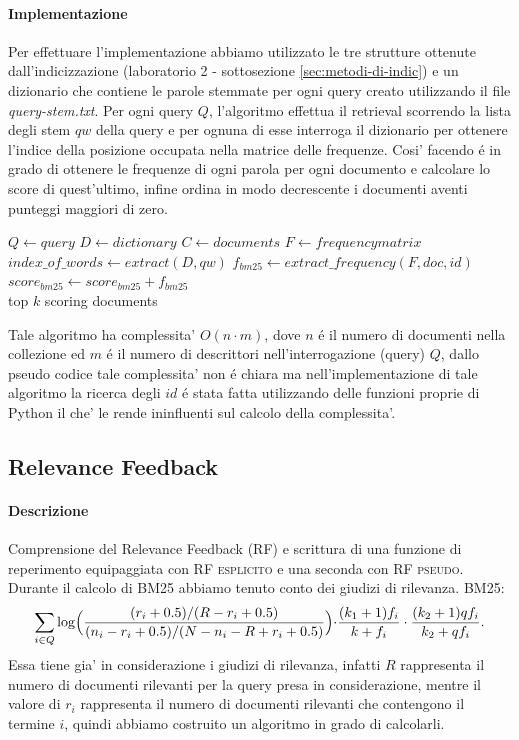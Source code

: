 \paragraph{\textbf{Implementazione}}
Per effettuare l'implementazione abbiamo utilizzato le tre strutture ottenute dall'indicizzazione (laboratorio 2 - sottosezione \ref{sec:metodi-di-indic}) e un dizionario che contiene le parole stemmate per ogni query creato utilizzando il file \textit{query-stem.txt}. Per ogni query $Q$, l'algoritmo effettua il retrieval scorrendo la lista degli stem $qw$ della query e per ognuna di esse interroga il dizionario per ottenere l'indice della posizione occupata nella matrice delle frequenze. Cosi' facendo \'e in grado di ottenere le frequenze di ogni parola per ogni documento e calcolare lo score di quest'ultimo, infine ordina in modo decrescente i documenti aventi punteggi maggiori di zero.
\begin{algorithmic}
\State $Q \gets query$
\State $D \gets dictionary$
\State $C \gets documents$
\State $F \gets frequency matrix$
	\State $index\_of\_words \gets extract(D,qw)$
			\State $f_{bm25} \gets extract\_frequency(F,doc,id)$
		\EndFor
		\State $score_{bm25} \gets score_{bm25} + f_{bm25}$
	\EndFor
\EndFor\\
\Return top $k$ scoring documents
\end{algorithmic}
Tale algoritmo ha complessita' $O(n \cdot m)$, dove $n$ \'e il numero di documenti nella collezione ed $m$ \'e il numero di descrittori nell'interrogazione (query) $Q$, dallo pseudo codice tale complessita' non \'e chiara ma nell'implementazione di tale algoritmo la ricerca degli $id$ \'e stata fatta utilizzando delle funzioni proprie di Python il che' le rende ininfluenti sul calcolo della complessita'. 

\subsection{Relevance Feedback}
\label{sec:relevance-feedback}

\paragraph{\textbf{Descrizione}}
Comprensione del Relevance Feedback (\textsc{RF}) e scrittura di una funzione di reperimento equipaggiata con \textsc{RF esplicito} e una seconda con \textsc{RF pseudo}.
Durante il calcolo di \textsc{BM25} abbiamo tenuto conto dei giudizi di rilevanza.
BM25:
\[ \sum\limits_{i \in Q}\log\Bigl(\frac{(r_i+0.5)/(R-r_i+0.5)}{(n_i-r_i+0.5)/(N-n_i-R+r_i+0.5)}\Bigl)\cdot\frac{(k_1+1)f_i}{k+f_i}\cdot\frac{(k_2+1)qf_i}{k_2+qf_i}. \]
Essa tiene gia' in considerazione i giudizi di rilevanza, infatti $R$ rappresenta il numero di documenti rilevanti per la query presa in considerazione, mentre il valore di $r_i$ rappresenta il numero di documenti rilevanti che contengono il termine $i$, quindi abbiamo costruito un algoritmo in grado di calcolarli.

